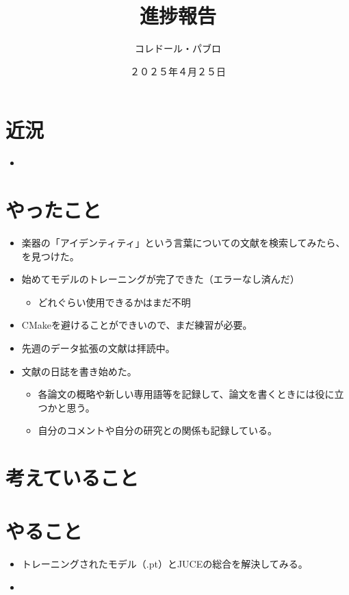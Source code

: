 \documentclass[a4paper, 12pt]{article}
\title{進捗報告}
\author{コレドール・パブロ}
\date{２０２５年４月２５日}
\begin{document}
\maketitle

\section*{近況}
\begin{itemize}
    \item 
\end{itemize} 

\section*{やったこと}
\begin{itemize}
    \item 楽器の「アイデンティティ」という言葉についての文献を検索してみたら、\cite{IdentityAugmenting}を見つけた。
    \item 始めてモデルのトレーニングが完了できた（エラーなし済んだ）
    \begin{itemize}
        \item どれぐらい使用できるかはまだ不明
    \end{itemize}
    \item CMakeを避けることができいので、まだ練習が必要。
    \item 先週のデータ拡張の文献は拝読中。
    \item 文献の日誌を書き始めた。
    \begin{itemize}
        \item 各論文の概略や新しい専用語等を記録して、論文を書くときには役に立つかと思う。
        \item 自分のコメントや自分の研究との関係も記録している。
    \end{itemize}
\end{itemize}

\section*{考えていること}

\section*{やること}
\begin{itemize}
    \item トレーニングされたモデル（.pt）とJUCEの総合を解決してみる。
    \item 
\end{itemize}



\end{document}
